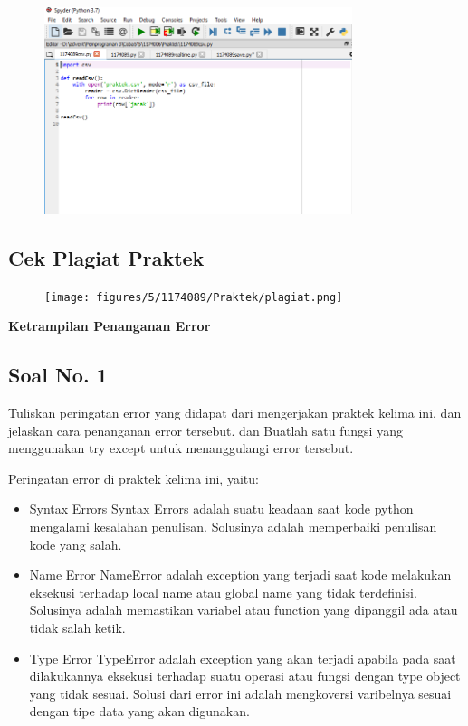 \begin{figure}[H]
	\includegraphics[width=9cm]{figures/5/1174089/Praktek/csv.png}
	\centering
\end{figure}

\subsection{Cek Plagiat Praktek}
\begin{figure}[H]
	\texttt{[image: figures/5/1174089/Praktek/plagiat.png]}
	\centering
\end{figure}

\hfill \break
{\Large \textbf{Ketrampilan Penanganan Error}}

\subsection{Soal No. 1}
Tuliskan  peringatan  error  yang  didapat  dari  mengerjakan  praktek  kelima  ini, dan  jelaskan  cara  penanganan  error  tersebut.   dan  Buatlah  satu  fungsi  yang menggunakan try except untuk menanggulangi error tersebut.

\hfill \break
Peringatan error di praktek kelima ini, yaitu:
\begin{itemize}
	\item Syntax Errors
	Syntax Errors adalah suatu keadaan saat kode python mengalami kesalahan penulisan. Solusinya adalah memperbaiki penulisan kode yang salah.
	
	\item Name Error
	NameError adalah exception yang terjadi saat kode melakukan eksekusi terhadap local name atau global name yang tidak terdefinisi. Solusinya adalah memastikan variabel atau function yang dipanggil ada atau tidak salah ketik.
	
	\item Type Error
	TypeError adalah exception yang akan terjadi apabila pada saat dilakukannya eksekusi terhadap suatu operasi atau fungsi dengan type object yang tidak sesuai. Solusi dari error ini adalah mengkoversi varibelnya sesuai dengan tipe data yang akan digunakan.
\end{itemize}

